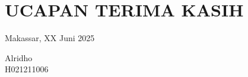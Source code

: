 \begingroup
\chapter*{UCAPAN TERIMA KASIH}
\noindent

\vspace{2cm}

\hfill
\begin{minipage}{0.4\textwidth}
  \raggedleft
  Makassar, XX Juni 2025 \par
  \vspace{2cm}
  Alridho \\
  H021211006
\end{minipage}
\endgroup
